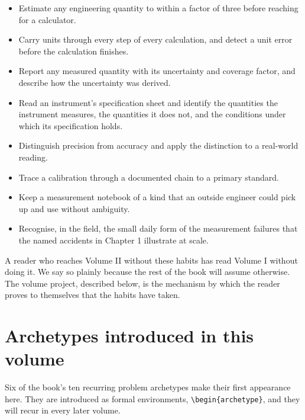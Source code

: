 \begin{itemize}[leftmargin=*]
  \item Estimate any engineering quantity to within a factor of three
    before reaching for a calculator.
  \item Carry units through every step of every calculation, and
    detect a unit error before the calculation finishes.
  \item Report any measured quantity with its uncertainty and
    coverage factor, and describe how the uncertainty was derived.
  \item Read an instrument's specification sheet and identify the
    quantities the instrument measures, the quantities it does not,
    and the conditions under which its specification holds.
  \item Distinguish precision from accuracy and apply the
    distinction to a real-world reading.
  \item Trace a calibration through a documented chain to a
    primary standard.
  \item Keep a measurement notebook of a kind that an outside
    engineer could pick up and use without ambiguity.
  \item Recognise, in the field, the small daily form of the
    measurement failures that the named accidents in Chapter 1
    illustrate at scale.
\end{itemize}

A reader who reaches Volume II without these habits has read Volume I
without doing it. We say so plainly because the rest of the book
will assume otherwise. The volume project, described below, is the
mechanism by which the reader proves to themselves that the habits
have taken.

\section*{Archetypes introduced in this volume}

Six of the book's ten recurring problem archetypes make their first
appearance here. They are introduced as formal environments,
\verb|\begin{archetype}|, and they will recur in every later volume.

